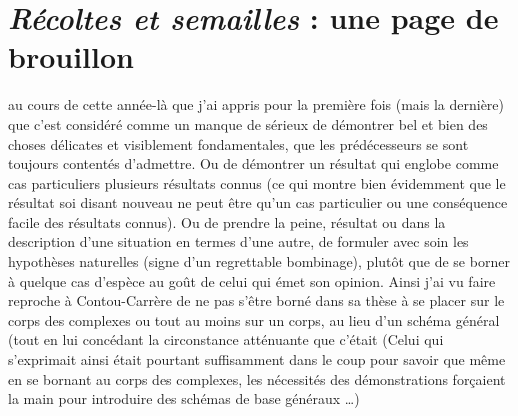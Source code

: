 \documentclass[11pt,a4paper]{article}
\begin{document}
\section{\emph{Récoltes et semailles} : une page de brouillon}


au cours de cette année-là que j'ai appris pour la première fois (mais
  la dernière\add{ !}) \struck{\ill{} (*)} que c'est considéré comme un manque de
sérieux de démontrer bel et bien des choses délicates et visiblement
fondamentales,  que les prédécesseurs se sont toujours contentés d'admettre\add{(*)}. Ou de démontrer un résultat qui englobe comme cas particuliers plusieurs résultats  connus (ce qui montre bien évidemment que le résultat soi
disant nouveau ne peut être qu'un cas particulier ou une conséquence facile
des résultats connus). Ou de prendre la peine, \struck{\ill{}}  résultat
ou dans la description d'une situation en termes d'une autre, de formuler
avec soin les hypothèses naturelles (signe d'un regrettable bombinage),
plutôt que de se  borner  à quelque cas d'espèce au
goût de celui qui émet son opinion. Ainsi j'ai vu faire reproche à
Contou-Carrère de ne pas s'être borné dans sa thèse à se placer sur le
corps des complexes ou tout au moins sur un corps, au lieu d'un schéma
général (tout en lui concédant  la circonstance atténuante que c'était   (Celui qui s'exprimait ainsi était pourtant suffisamment dans le
coup pour savoir que même en se bornant au corps des complexes, les nécessités des \struck{\ill{}} démonstrations forçaient la main pour introduire des schémas de
base généraux …)
\end{document}
